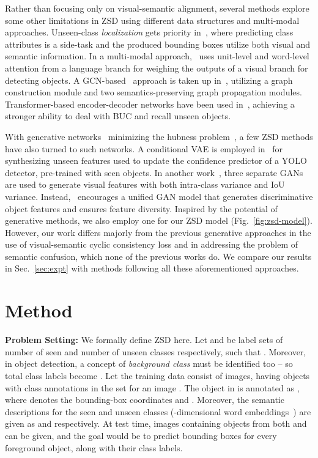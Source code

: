 \documentclass{bmvc2k}
\begin{document}
Rather than focusing only on visual-semantic alignment, several methods explore some other limitations in ZSD using different data structures and multi-modal approaches. Unseen-class {\em localization} gets priority in~\cite{zhu2019learning}, where predicting class attributes is a side-task and the produced bounding boxes utilize both visual and semantic information. In a multi-modal approach,~\cite{li2019zero} uses unit-level and word-level attention from a language branch for weighing the outputs of a visual branch for detecting objects. A GCN-based~\cite{welling2016semi} approach is taken up in~\cite{yan2020semantics}, utilizing a graph construction module and two semantics-preserving graph propagation modules. Transformer-based encoder-decoder networks have been used in~\cite{zheng2021zero}, achieving a stronger ability to deal with BUC and recall unseen objects.

With generative networks~\cite{goodfellow2014generative, DBLP:journals/corr/KingmaW13} minimizing the hubness problem~\cite{radovanovic2010hubs}, a few ZSD methods have also turned to such networks. A conditional VAE is employed in~\cite{zhu2020don} for synthesizing unseen features used to update the confidence predictor of a YOLO~\cite{redmon2017yolo9000} detector, pre-trained with seen objects. In another work~\cite{zhao2020gtnet}, three separate GANs are used to generate visual features with both intra-class variance and IoU variance. Instead,~\cite{hayat2020synthesizing} encourages a unified GAN model that generates discriminative object features and ensures feature diversity. Inspired by the potential of generative methods, we also employ one for our ZSD model (Fig.~\ref{fig:zsd-model}). However, our work differs majorly from the previous generative approaches in the use of visual-semantic cyclic consistency loss and in addressing the problem of semantic confusion, which none of the previous works do. We compare our results in Sec.~\ref{sec:expt} with methods following all these aforementioned approaches. 




\section{Method}
\label{sec:method}
{\bf Problem Setting:} We formally define ZSD here. Let  and  be label sets of  number of seen and  number of unseen classes respectively, such that . Moreover, in object detection, a concept of {\em background class} must be identified too -- so total class labels become .  Let the training data  consist of  images, having  objects with class annotations in the set  for an image . The  object in  is annotated as , where  denotes the bounding-box coordinates and . 
Moreover, the semantic descriptions for the seen and unseen classes (-dimensional word embeddings~\cite{mikolov2013distributed, pennington2014glove, joulin-etal-2017-bag}) are given as  and  respectively. At test time, images containing objects from both  and  can be given, and the goal would be to predict bounding boxes for every foreground object, along with their class labels. 
\end{document}
